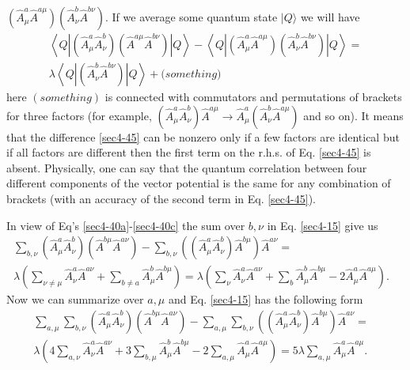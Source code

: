\documentclass[a4paper,a4paper]{article}
\begin{document}
$(\hat A^a_\mu \hat A^{a\mu})(\hat A^b_\nu \hat A^{b \nu})$. 
If we average some quantum state $| Q \rangle$ we will have 
\begin{equation}
\begin{split}
  \left\langle Q | 
  \left( \hat A^a_\mu \hat A^b_\nu \right) 
  \left( \hat A^{a\mu} \hat A^{b\nu} \right)
  | Q \right\rangle - 
  \left\langle Q | 
  \left( \hat A^a_\mu \hat A^{a\mu} \right) 
  \left( \hat A^b_\nu \hat A^{b\nu} \right)
  | Q \right\rangle = \\
  \lambda 
  \left\langle Q | 
  \left( \hat A^b_\nu \hat A^{b\nu} \right)
  | Q \right\rangle + 
  \bigl( something \bigl)
\label{sec4-45}
\end{split}
\end{equation}
here $(something)$ is connected with commutators and permutations of 
brackets for three factors (for example, 
$(\hat A^a_\mu \hat A^b_\nu) \hat A^{a \mu} \rightarrow 
\hat A^a_\mu (\hat A^b_\nu \hat A^{a \mu})$ 
and so on). It means that the difference \eqref{sec4-45} can be nonzero 
only if a few factors are identical but if all factors are different then 
the first term on the r.h.s. of Eq. \eqref{sec4-45} is absent. Physically, 
one can say that the quantum correlation between four different components 
of the vector potential is the same for any combination of brackets 
(with an accuracy of the second term in Eq. \eqref{sec4-45}). 
\par 
In view of Eq's \eqref{sec4-40a}-\eqref{sec4-40c} the sum over 
$b, \nu$ in Eq. \eqref{sec4-15} give us 
\begin{equation}
\begin{split}
  \sum_{b, \nu} 
  \left(
  \hat{A}^a_\mu \hat{A}^b_\nu
  \right) 
  \left( 
  \hat{A}^{b \mu} \hat{A}^{a \nu} 
  \right) - 
  \sum_{b, \nu} 
  \left( \left( \hat{A}^a_\mu \hat{A}^b_\nu 
  \right) \hat{A}^{b \mu} \right) \hat{A}^{a \nu} = & \\
  \lambda 
  \left(
  \sum_{\nu \neq \mu} \hat{A}^a_\nu \hat{A}^{a\nu} + 
  \sum_{b \neq a} \hat{A}^b_\mu \hat{A}^{b\mu}
  \right) = 
  \lambda 
  \left(
  \sum_\nu \hat{A}^a_\nu \hat{A}^{a\nu} + 
  \sum_b \hat{A}^b_\mu \hat{A}^{b\mu} - 
  2 \hat{A}^a_\mu \hat{A}^{a\mu}
  \right) . 
\label{sec4-50}
\end{split}
\end{equation}
Now we can summarize over $a, \mu$ and Eq. \eqref{sec4-15} 
has the following form 
\begin{equation}
\begin{split}
  \sum_{a, \mu} \sum_{b, \nu}
  \left(
  \hat{A}^a_\mu \hat{A}^b_\nu
  \right) 
  \left( 
  \hat{A}^{b \mu} \hat{A}^{a \nu} 
  \right) - 
  \sum_{a, \mu} \sum_{b, \nu} 
  \left( \left( \hat{A}^a_\mu \hat{A}^b_\nu 
  \right) \hat{A}^{b \mu} \right) \hat{A}^{a \nu} = & \\
  \lambda 
  \left(
  4 \sum_{a,\nu} \hat{A}^a_\nu \hat{A}^{a\nu} + 
  3 \sum_{b, \mu} \hat{A}^b_\mu \hat{A}^{b \mu} - 
  2 \sum_{a, \mu} \hat{A}^a_\mu \hat{A}^{a \mu}
  \right) = 
  5 \lambda \sum_{a, \mu} \hat{A}^a_\mu \hat{A}^{a \mu} . 
\label{sec4-60}
\end{split}
\end{equation}
\end{document}
